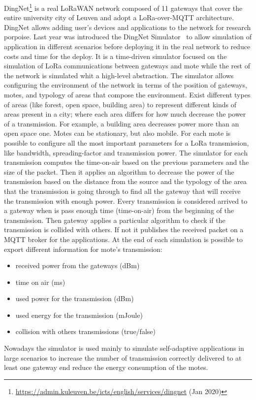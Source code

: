 DingNet\footnote{\href{https://admin.kuleuven.be/icts/english/services/dingnet}{https://admin.kuleuven.be/icts/english/services/dingnet} (Jan 2020)} is a real LoRaWAN network composed of 11 gateways that cover the entire university city of Leuven and adopt a LoRa-over-MQTT architecture. 
% 
DingNet allows adding user's devices and applications to the network for research porpoise.
% 
Last year was introduced the DingNet Simulator~\cite{inproceedings} to allow simulation of application in different scenarios before deploying it in the real network to reduce costs and time for the deploy.
% 
It is a time-driven simulator focused on the simulation of LoRa communications between gateways and mote while the rest of the network is simulated whit a high-level abstraction. 
% 
The simulator allows configuring the environment of the network in terms of the position of gateways, motes, and typology of areas that compose the environment. 
% 
Exist different types of areas (like forest, open space, building area) to represent different kinds of areas present in a city; where each area differs for how much decrease the power of a transmission. For example, a building area decreases power more than an open space one.
% 
Motes can be stationary, but also mobile.
% 
For each mote is possible to configure all the most important parameters for a LoRa transmission, like bandwidth, spreading-factor and transmission power. 
% 
The simulator for each transmission computes the time-on-air based on the previous parameters and the size of the packet. 
% 
Then it applies an algorithm to decrease the power of the transmission based on the distance from the source and the typology of the area that the transmission is going through to find all the gateway that will receive the transmission with enough power.
% 
Every transmission is considered arrived to a gateway when is pass enough time (time-on-air) from the beginning of the transmission. 
Then gateway applies a particular algorithm to check if the transmission is collided with others. If not it publishes the received packet on a MQTT broker for the applications.
%
At the end of each simulation is possible to export different information for mote's transmission:
\begin{itemize}
    \item received power from the gateways (dBm)
    \item time on air (ms)
    \item used power for the transmission (dBm)
    \item used energy for the transmission (mJoule)
    \item collision with others transmissions (true/false)
\end{itemize}
Nowadays the simulator is used mainly to simulate self-adaptive applications in large scenarios to increase the number of transmission correctly delivered to at least one gateway end reduce the energy consumption of the motes.
